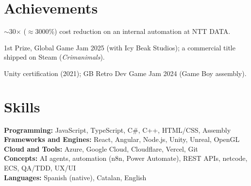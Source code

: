 \documentclass[10pt,a4paper]{article}
\begin{document}
\section{Achievements}
\begin{cvitems}
  \item $\sim$30$\times$ ($\approx$3000\%) cost reduction on an internal automation at NTT DATA.
  \item 1st Prize, Global Game Jam 2025 (with Icy Beak Studios); a commercial title shipped on Steam (\textit{Crimanimals}).
  \item Unity certification (2021); GB Retro Dev Game Jam 2024 (Game Boy assembly).
\end{cvitems}

\section{Skills}
\textbf{Programming:} JavaScript, TypeScript, C\#, C++, HTML/CSS, Assembly \\[2.5pt]
\textbf{Frameworks and Engines:} React, Angular, Node.js, Unity, Unreal, OpenGL \\[2.5pt]
\textbf{Cloud and Tools:} Azure, Google Cloud, Cloudflare, Vercel, Git \\[2.5pt]
\textbf{Concepts:} AI agents, automation (n8n, Power Automate), REST APIs, netcode, ECS, QA/TDD, UX/UI \\[2.5pt]
\textbf{Languages:} Spanish (native), Catalan, English
\end{document}
